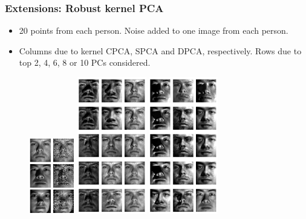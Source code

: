 \documentclass[handout,10pt]{beamer}
\begin{document}
\begin{frame}
\frametitle{Extensions: Robust kernel PCA}

\begin{footnotesize}
\begin{itemize}
\item 20 points from each person. Noise added to one image from each person.
\item Columns due to kernel CPCA, SPCA and DPCA, respectively. Rows due to top 2, 4, 6, 8 or 10 PCs considered.
\end{itemize}
\end{footnotesize}

\begin{figure}[h]
	\centering
		\includegraphics[width=2cm]{yale1.png}
		\hspace{.2cm}
		\includegraphics[width=3cm]{yaleB01recon.png}
		\hspace{.2cm}
		\includegraphics[width=3cm]{yaleB02recon.png}
		\hspace{.2cm}

\end{figure}
\end{frame}
\end{document}
